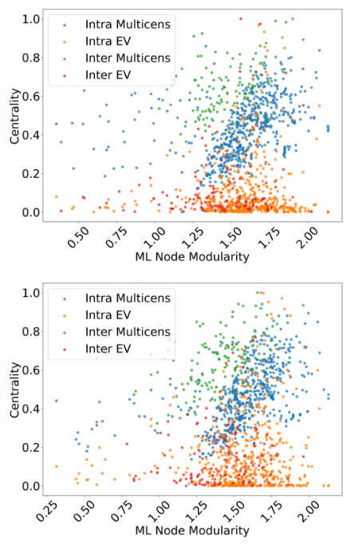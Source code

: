 \documentclass[10pt,letterpaper]{article}
\begin{document}
\begin{figure}[h!]
	\begin{minipage}[b]{0.25\linewidth}
		\centering
		\includegraphics[width=\textwidth]{figs/fig4.png}
		\subcaption{}
		\label{fig4}
	\end{minipage}
	\hspace{0.5cm}
	\begin{minipage}[b]{0.25\linewidth}
		\centering
		\includegraphics[width=\textwidth]{figs/fig5.png}
		\subcaption{}
	\end{minipage}
	\hspace{0.5cm}
	\begin{minipage}[b]{0.25\linewidth}
		\centering

\end{minipage}
\end{figure}
\end{document}
